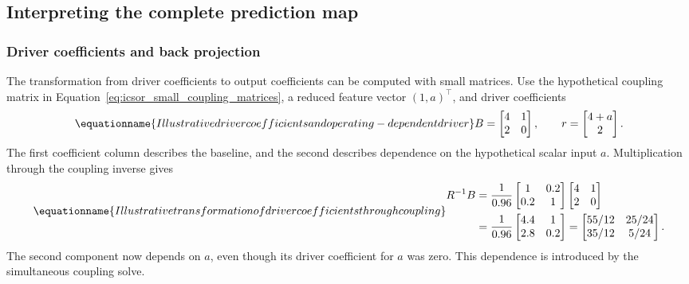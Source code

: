 \subsection{Interpreting the complete prediction map}

\subsubsection{Driver coefficients and back projection}

The transformation from driver coefficients to output coefficients can be computed with small matrices. Use the hypothetical coupling matrix in Equation~\eqref{eq:icsor_small_coupling_matrices}, a reduced feature vector \((1,a)^\top\), and driver coefficients
\begin{equation}
\equationname{Illustrative driver coefficients and operating-dependent driver}
\label{eq:icsor_small_driver_coefficient_matrix}
B=\begin{bmatrix}4&1\\2&0\end{bmatrix},
\qquad
r=\begin{bmatrix}4+a\\2\end{bmatrix}.
\end{equation}
The first coefficient column describes the baseline, and the second describes dependence on the hypothetical scalar input \(a\). Multiplication through the coupling inverse gives
\begin{equation}
\equationname{Illustrative transformation of driver coefficients through coupling}
\label{eq:icsor_small_back_projection}
\begin{aligned}
R^{-1}B
&=\frac{1}{0.96}
\begin{bmatrix}1&0.2\\0.2&1\end{bmatrix}
\begin{bmatrix}4&1\\2&0\end{bmatrix}\\
&=\frac{1}{0.96}\begin{bmatrix}4.4&1\\2.8&0.2\end{bmatrix}
=\begin{bmatrix}55/12&25/24\\35/12&5/24\end{bmatrix}.
\end{aligned}
\end{equation}
The second component now depends on \(a\), even though its driver coefficient for \(a\) was zero. This dependence is introduced by the simultaneous coupling solve.

